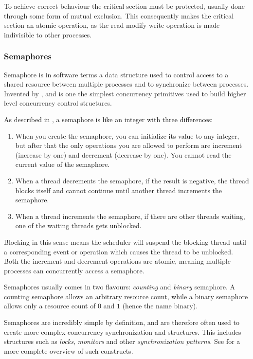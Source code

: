 To achieve correct behaviour the critical section must be protected, usually done through some form of mutual exclusion. This consequently makes the critical section an atomic operation, as the read\hyp{}modify\hyp{}write operation is made indivisible to other processes.


\subsubsection{Semaphores}


Semaphore is in software terms a data structure used to control access to a shared resource between multiple processes and to synchronize between processes. Invented by \citet{dijkstra}, and is one the simplest concurrency primitives used to build higher level concurrency control structures.

As described in \citet[chapter 2]{downey2016}, a semaphore is like an integer with three differences:

\begin{enumerate}[topsep=0em,itemsep=-1em,partopsep=0.5em,parsep=1em]
    \item When you create the semaphore, you can initialize its value to any integer, but after that the only operations you are allowed to perform are increment (increase by one) and decrement (decrease by one). You cannot read the current value of the semaphore.
    \item When a thread decrements the semaphore, if the result is negative, the thread blocks itself and cannot continue until another thread increments the semaphore.
    \item When a thread increments the semaphore, if there are other threads waiting, one of the waiting threads gets unblocked.
\end{enumerate}

Blocking in this sense means the scheduler will suspend the blocking thread until a corresponding event or operation which causes the thread to be unblocked. Both the increment and decrement operations are atomic, meaning multiple processes can concurrently access a semaphore.

Semaphores usually comes in two flavours: \textit{counting} and \textit{binary} semaphore. A counting semaphore allows an arbitrary resource count, while a binary semaphore allows only a resource count of $0$ and $1$ (hence the name binary). 

Semaphores are incredibly simple by definition, and are therefore often used to create more complex concurrency synchronization and structures. This includes structures such as \textit{locks}, \textit{monitors} and other \textit{synchronization patterns}. See \citet[chap. 3-7]{downey2016} for a more complete overview of such constructs.


